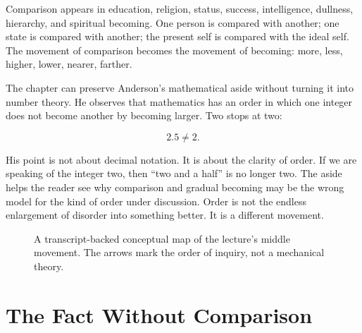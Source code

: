 Comparison appears in education, religion, status, success, intelligence, dullness, hierarchy, and spiritual becoming. One person is compared with another; one state is compared with another; the present self is compared with the ideal self. The movement of comparison becomes the movement of becoming: more, less, higher, lower, nearer, farther.

The chapter can preserve Anderson's mathematical aside without turning it into number theory. He observes that mathematics has an order in which one integer does not become another by becoming larger. Two stops at two:

\begin{equation}
2.5 \neq 2.
\end{equation}

His point is not about decimal notation. It is about the clarity of order. If we are speaking of the integer two, then ``two and a half'' is no longer two. The aside helps the reader see why comparison and gradual becoming may be the wrong model for the kind of order under discussion. Order is not the endless enlargement of disorder into something better. It is a different movement.

\begin{figure}
\centering
{}

A transcript-backed conceptual map of the lecture's middle movement. The arrows mark the order of inquiry, not a mechanical theory.
\end{figure}

\section{The Fact Without Comparison}

